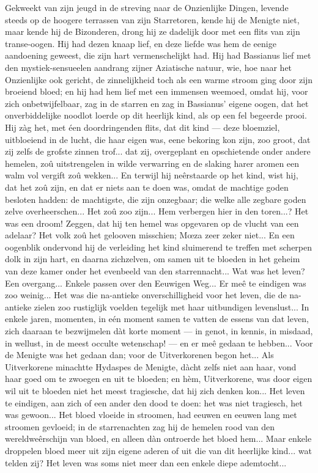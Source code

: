 \documentclass[a4paper, 12pt, oneside, dutch]{article}
\begin{document}
Gekweekt van zijn jeugd in de streving naar de Onzienlijke Dingen, levende steeds op de hoogere terrassen van zijn Starretoren, kende hij de Menigte niet, maar kende hij de Bizonderen, drong hij ze dadelijk door met een flits van zijn transe-oogen. Hij had dezen knaap lief, en deze liefde was hem de eenige aandoening geweest, die zijn hart vermenschelijkt had. Hij had Bassianus lief met den mystiek-sensueelen aandrang zijner Aziatische natuur, wie, hoe naar het Onzienlijke ook gericht, de zinnelijkheid toch als een warme stroom ging door zijn broeiend bloed; en hij had hem lief met een immensen weemoed, omdat hij, voor zich onbetwijfelbaar, zag in de starren en zag in Bassianus' eigene oogen, dat het onverbiddelijke noodlot loerde op dit heerlijk kind, als op een fel begeerde prooi. Hij zàg het, met éen doordringenden flits, dat dit kind --- deze bloemziel, uitbloeiend in de lucht, die haar eigen was, eene bekoring kon zijn, zoo groot, dat zij zelfs de grofste zinnen trof... dat zij, overgeplant en opschietende onder andere hemelen, zoû uitstrengelen in wilde verwarring en de slaking harer aromen een walm vol vergift zoû wekken... En terwijl hij neêrstaarde op het kind, wist hij, dat het zoû zijn, en dat er niets aan te doen was, omdat de machtige goden besloten hadden: de machtigste, die zijn onzegbaar; die welke alle zegbare goden zelve overheerschen... Het zoû zoo zijn... Hem verbergen hier in den toren...? Het was een droom! Zeggen, dat hij ten hemel was opgevaren op de vlucht van een adelaar? Het volk zoû het gelooven misschien; Mœza zeer zeker niet... En een oogenblik ondervond hij de verleiding het kind sluimerend te treffen met scherpen dolk in zijn hart, en daarna zichzelven, om samen uit te bloeden in het geheim van deze kamer onder het evenbeeld van den starrennacht... Wat was het leven? Een overgang... Enkele passen over den Eeuwigen Weg... Er meê te eindigen was zoo weinig... Het was die na-antieke onverschilligheid voor het leven, die de na-antieke zielen zoo rustiglijk voelden tegelijk met haar uitbundigen levenslust... In enkele jaren, momenten, in eén moment samen te vatten de essens van dat leven, zich daaraan te bezwijmelen dàt korte moment --- in genot, in kennis, in misdaad, in wellust, in de meest occulte wetenschap! --- en er meê gedaan te hebben... Voor de Menigte was het gedaan dan; voor de Uitverkorenen begon het... Als Uitverkorene minachtte Hydaspes de Menigte, dàcht zelfs niet aan haar, vond haar goed om te zwoegen en uit te bloeden; en hèm, Uitverkorene, was door eigen wil uit te bloeden niet het meest tragiesche, dat hij zich denken kon... Het leven te eindigen, aan zich of een ander den dood te doen: het was niet tragiesch, het was gewoon... Het bloed vloeide in stroomen, had eeuwen en eeuwen lang met stroomen gevloeid; in de starrenachten zag hij de hemelen rood van den wereldweêrschijn van bloed, en alleen dàn ontroerde het bloed hem... Maar enkele droppelen bloed meer uit zijn eigene aderen of uit die van dit heerlijke kind... wat telden zij? Het leven was soms niet meer dan een enkele diepe ademtocht...
\end{document}
